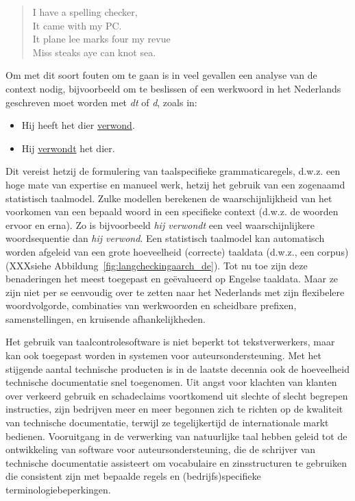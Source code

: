 \documentclass[]{../../metanetpaper}
\begin{document}
\begin{multicols}{2}
\begin{quote}
  I have a spelling checker,\\
  It came with my PC.\\
  It plane lee marks four my revue\\
  Miss steaks aye can knot sea.
\end{quote}



    Om met dit soort fouten om te gaan is in veel gevallen een analyse van de context nodig, bijvoorbeeld om te beslissen of een werkwoord in het Nederlands geschreven moet worden met \emph{dt} of \emph{d}, zoals in:

\begin{itemize}
 \item   Hij heeft het dier \underline{verwond}.
 \item   Hij \underline{verwondt} het dier.
\end{itemize}



    Dit vereist hetzij de formulering van taalspecifieke grammaticaregels, d.w.z. een hoge mate van expertise en manueel werk, hetzij het gebruik van een zogenaamd statistisch taalmodel. Zulke modellen berekenen de waarschijnlijkheid van het voorkomen van een bepaald woord in een specifieke context (d.w.z. de woorden ervoor en erna). Zo is bijvoorbeeld \emph{hij verwondt} een veel waarschijnlijkere woordsequentie dan \emph{hij verwond}. Een statistisch taalmodel kan automatisch worden afgeleid van een grote hoeveelheid (correcte) taaldata (d.w.z., een corpus) (XXXsiehe Abbildung~\ref{fig:langcheckingaarch_de}). Tot nu toe zijn deze benaderingen het meest toegepast en ge{\"e}valueerd op Engelse taaldata. Maar ze zijn niet per se eenvoudig over te zetten naar het Nederlands met zijn flexibelere woordvolgorde, combinaties van werkwoorden en scheidbare prefixen, samenstellingen, en kruisende afhankelijkheden.


    Het gebruik van taalcontrolesoftware is niet beperkt tot tekstverwerkers, maar kan ook toegepast worden in systemen voor auteursondersteuning. Met het stijgende aantal technische producten is in de laatste decennia ook de hoeveelheid technische documentatie snel toegenomen. Uit angst voor klachten van klanten over verkeerd gebruik en schadeclaims voortkomend uit slechte of slecht begrepen instructies, zijn bedrijven meer en meer begonnen zich te richten op de kwaliteit van technische documentatie, terwijl ze tegelijkertijd de internationale markt bedienen. Vooruitgang in de verwerking van natuurlijke taal hebben geleid tot de ontwikkeling van software voor auteursondersteuning, die de schrijver van technische documentatie assisteert om vocabulaire en zinsstructuren te gebruiken die consistent zijn met bepaalde regels en (bedrijfs)specifieke terminologiebeperkingen.




\end{multicols}
\end{document}
